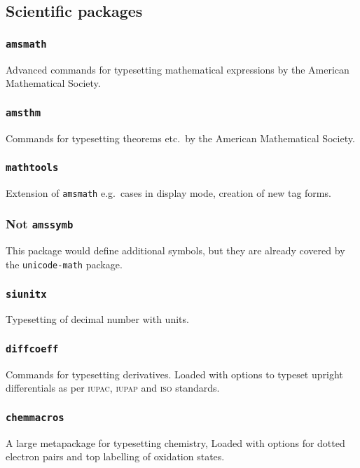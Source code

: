 \documentclass{article}
\begin{document}
\subsection{Scientific packages}
\subsubsection{\texttt{amsmath}}
Advanced commands for typesetting mathematical expressions by the American Mathematical Society.
\subsubsection{\texttt{amsthm}}
Commands for typesetting theorems etc.\ by the American Mathematical Society.
\subsubsection{\texttt{mathtools}}
Extension of \texttt{amsmath} e.g.\ cases in display mode, creation of new tag forms.
\subsubsection{Not \texttt{amssymb}}
This package would define additional symbols, but they are already covered by the \texttt{unicode-math} package.
\subsubsection{\texttt{siunitx}}
Typesetting of decimal number with units.
\subsubsection{\texttt{diffcoeff}}
Commands for typesetting derivatives. Loaded with options to typeset upright differentials as per \textsc{iupac}, \textsc{iupap} and \textsc{iso} standards.
\subsubsection{\texttt{chemmacros}}
A large metapackage for typesetting chemistry, Loaded with options for dotted electron pairs and top labelling of oxidation states.
\end{document}
